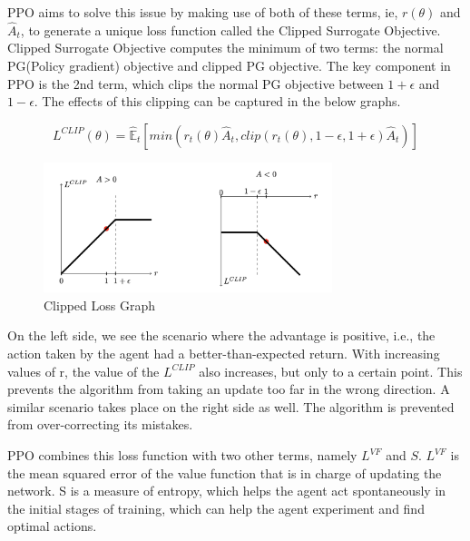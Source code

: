 PPO aims to solve this issue by making use of both of these terms, ie, $r(\theta)$ and $\hat{A}_{t}$, to generate a unique loss function called the Clipped Surrogate Objective. Clipped Surrogate Objective computes the minimum of two terms: the normal PG(Policy gradient) objective and clipped PG objective. The key component in PPO is the 2nd term, which clips the normal PG objective between $1 + \epsilon$ and $1 - \epsilon$. The effects of this clipping can be captured in the below graphs. 


\begin{equation}
    L^{CLIP}(\theta) = \hat{\mathbb{E}}_{t}[min(r_{t}(\theta) \hat{A}_{t}, clip(r_{t}(\theta), 1- \epsilon, 1 + \epsilon)\hat{A}_{t})]
\end{equation}

\begin{figure}[H]
    \centering
    \includegraphics[width=0.75\textwidth]{images/clipped-loss-graph.png}
    \caption{Clipped Loss Graph}
    \label{fig:rl}
\end{figure}


On the left side, we see the scenario where the advantage is positive, i.e., the action taken by the agent had a better-than-expected return. With increasing values of r, the value of the $L^{CLIP}$ also increases, but only to a certain point. This prevents the algorithm from taking an update too far in the wrong direction. A similar scenario takes place on the right side as well. The algorithm is prevented from over-correcting its mistakes. 

PPO combines this loss function with two other terms, namely $L^{VF}$ and $S$. $L^{VF}$ is the mean squared error of the value function that is in charge of updating the network. S is a measure of entropy, which helps the agent act spontaneously in the initial stages of training, which can help the agent experiment and find optimal actions.



